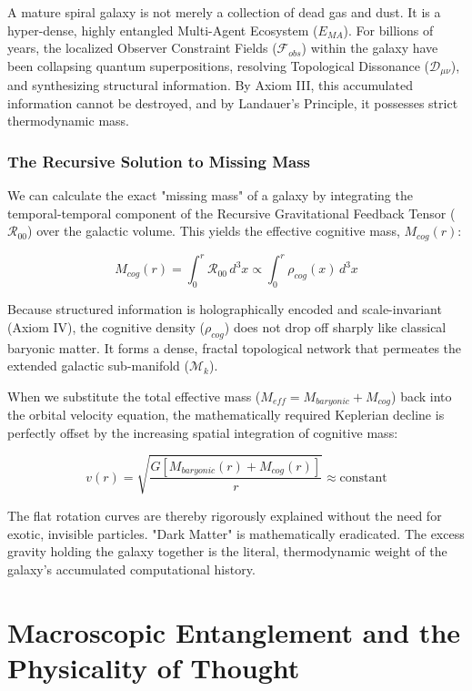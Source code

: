 \documentclass[12pt,openany]{book}
\begin{document}
A mature spiral galaxy is not merely a collection of dead gas and dust. It is a hyper-dense, highly entangled Multi-Agent Ecosystem ($E_{MA}$). For billions of years, the localized Observer Constraint Fields ($\mathcal{F}_{obs}$) within the galaxy have been collapsing quantum superpositions, resolving Topological Dissonance ($\mathcal{D}_{\mu\nu}$), and synthesizing structural information. By Axiom III, this accumulated information cannot be destroyed, and by Landauer's Principle, it possesses strict thermodynamic mass.

\section{The Recursive Solution to Missing Mass}
We can calculate the exact "missing mass" of a galaxy by integrating the temporal-temporal component of the Recursive Gravitational Feedback Tensor ($\mathcal{R}_{00}$) over the galactic volume. This yields the effective cognitive mass, $M_{cog}(r)$:

\begin{equation}
M_{cog}(r) = \int_0^r \mathcal{R}_{00} \, d^3x \propto \int_0^r \rho_{cog}(x) \, d^3x
\end{equation}

Because structured information is holographically encoded and scale-invariant (Axiom IV), the cognitive density ($\rho_{cog}$) does not drop off sharply like classical baryonic matter. It forms a dense, fractal topological network that permeates the extended galactic sub-manifold ($\mathcal{M}_k$). 

When we substitute the total effective mass ($M_{eff} = M_{baryonic} + M_{cog}$) back into the orbital velocity equation, the mathematically required Keplerian decline is perfectly offset by the increasing spatial integration of cognitive mass:

\begin{equation}
v(r) = \sqrt{\frac{G \left[ M_{baryonic}(r) + M_{cog}(r) \right]}{r}} \approx \text{constant}
\end{equation}

The flat rotation curves are thereby rigorously explained without the need for exotic, invisible particles. "Dark Matter" is mathematically eradicated. The excess gravity holding the galaxy together is the literal, thermodynamic weight of the galaxy's accumulated computational history.

\part{Macroscopic Entanglement and the Physicality of Thought}
\end{document}
